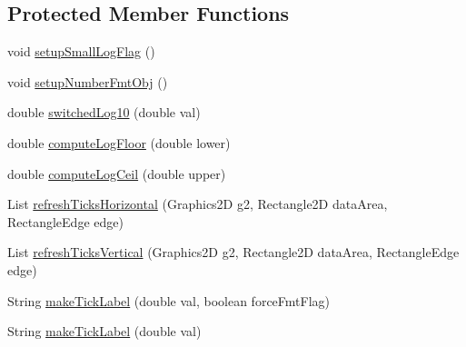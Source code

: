 \subsection*{Protected Member Functions}
\begin{DoxyCompactItemize}
\item 
void \mbox{\hyperlink{classorg_1_1jfree_1_1chart_1_1axis_1_1_logarithmic_axis_ad306f365f02d8ae244de783b086f056e}{setup\+Small\+Log\+Flag}} ()
\item 
void \mbox{\hyperlink{classorg_1_1jfree_1_1chart_1_1axis_1_1_logarithmic_axis_ae2e80ae7c1b256f982b6c4b0f814dbe4}{setup\+Number\+Fmt\+Obj}} ()
\item 
double \mbox{\hyperlink{classorg_1_1jfree_1_1chart_1_1axis_1_1_logarithmic_axis_adde2b61e7573af7c9cdf86b65a64c50d}{switched\+Log10}} (double val)
\item 
double \mbox{\hyperlink{classorg_1_1jfree_1_1chart_1_1axis_1_1_logarithmic_axis_aae87e6e19a0eddb7b2b1e08234c05362}{compute\+Log\+Floor}} (double lower)
\item 
double \mbox{\hyperlink{classorg_1_1jfree_1_1chart_1_1axis_1_1_logarithmic_axis_a7af4b16dd904d824cda4dcca085a33e1}{compute\+Log\+Ceil}} (double upper)
\item 
List \mbox{\hyperlink{classorg_1_1jfree_1_1chart_1_1axis_1_1_logarithmic_axis_ab66482bd3e0e85dc1438d309475db9d8}{refresh\+Ticks\+Horizontal}} (Graphics2D g2, Rectangle2D data\+Area, Rectangle\+Edge edge)
\item 
List \mbox{\hyperlink{classorg_1_1jfree_1_1chart_1_1axis_1_1_logarithmic_axis_a40e7c09b8d1d1cc3174d918ffb472a6a}{refresh\+Ticks\+Vertical}} (Graphics2D g2, Rectangle2D data\+Area, Rectangle\+Edge edge)
\item 
String \mbox{\hyperlink{classorg_1_1jfree_1_1chart_1_1axis_1_1_logarithmic_axis_a902abf4b50f29b055855f5a107e8f55d}{make\+Tick\+Label}} (double val, boolean force\+Fmt\+Flag)
\item 
String \mbox{\hyperlink{classorg_1_1jfree_1_1chart_1_1axis_1_1_logarithmic_axis_a7edca14caf425ea897487b27f82094cf}{make\+Tick\+Label}} (double val)
\end{DoxyCompactItemize}
